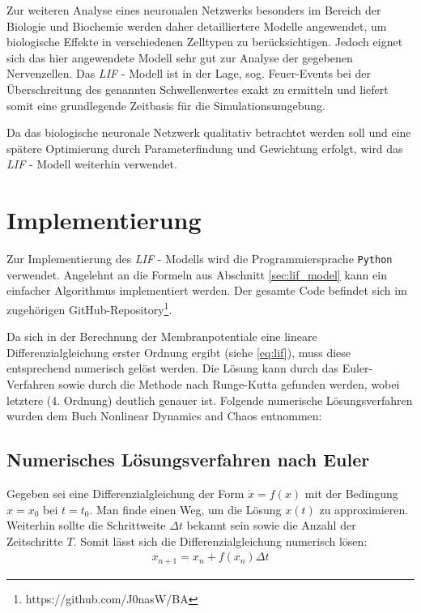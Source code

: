 	Zur weiteren Analyse eines neuronalen Netzwerks besonders im Bereich der Biologie und Biochemie werden daher detailliertere Modelle angewendet, um biologische Effekte in verschiedenen Zelltypen zu berücksichtigen. Jedoch eignet sich das hier angewendete Modell sehr gut zur Analyse der gegebenen Nervenzellen. Das \textit{LIF} - Modell ist in der Lage, sog. Feuer-Events bei der Überschreitung des genannten Schwellenwertes exakt zu ermitteln und liefert somit eine grundlegende Zeitbasis für die Simulationsumgebung.
	
	Da das biologische neuronale Netzwerk qualitativ betrachtet werden soll und eine spätere Optimierung durch Parameterfindung und Gewichtung erfolgt, wird das \textit{LIF} - Modell weiterhin verwendet.

\section{Implementierung}
\label{sec:lif_imp}
	Zur Implementierung des \textit{LIF} - Modells wird die Programmiersprache \texttt{Python} verwendet.  Angelehnt an die Formeln aus Abschnitt \ref{sec:lif_model} kann ein einfacher Algorithmus implementiert werden. Der gesamte Code befindet sich im zugehörigen GitHub-Repository\footnote{https://github.com/J0nasW/BA}.
	
	Da sich in der Berechnung der Membranpotentiale eine lineare Differenzialgleichung erster Ordnung ergibt (siehe \eqref{eq:lif}), muss diese entsprechend numerisch gelöst werden. Die Lösung kann durch das Euler-Verfahren sowie durch die Methode nach Runge-Kutta gefunden werden, wobei letztere (4. Ordnung) deutlich genauer ist. Folgende numerische Lösungsverfahren wurden dem Buch \glqq Nonlinear Dynamics and Chaos\grqq{} \cite{NonlinearDynamics} entnommen:
	\subsection{Numerisches Lösungsverfahren nach Euler}
		Gegeben sei eine Differenzialgleichung der Form $\dot{x} = f(x)$ mit der Bedingung $x = x_0$ bei $t = t_0$. Man finde einen Weg, um die Lösung $x(t)$ zu approximieren.\\
		Weiterhin sollte die Schrittweite $\Delta t$ bekannt sein sowie die Anzahl der Zeitschritte $T$. Somit lässt sich die Differenzialgleichung numerisch lösen:
		\begin{align}
			\label{eq:euler}
			x_{n+1} = x_n + f(x_n) \Delta t
		\end{align}
